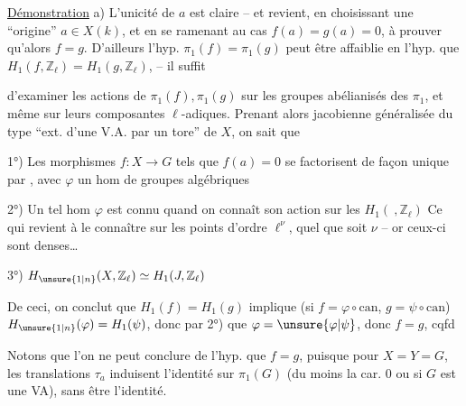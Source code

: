 
\uline{Démonstration} a) L'unicité de $a$ est claire -- et   revient,  en choisissant une ``origine'' $a\in X(k)$, et en se ramenant au cas $f(a)=g(a)=0$, à prouver qu'alors $f=g$. D'ailleurs l'hyp. $\pi_1(f)=\pi_1(g)$ peut être affaiblie en l'hyp. que  $H_1(f,\mathbb Z_\ell)=H_1(g,\mathbb Z_\ell)$,  --  il suffit

d'examiner les actions de $\pi_1(f),\pi_1(g)$ sur les groupes abélianisés des $\pi_1$, et même sur leurs composantes $\ell$-adiques. Prenant alors jacobienne généralisée du type ``ext. d'une V.A. par un tore'' de $X$, on sait que

1°) Les morphismes $f:X\longrightarrow G$ tels que $f(a)=0$ se factorisent de façon unique par
,
avec $\varphi$ un hom de groupes algébriques

2°)  Un tel hom $\varphi$ est connu quand on connaît son action sur les $H_1(\ ,\mathbb Z_\ell)$ Ce qui revient à le connaître sur les points d'ordre $\ell^\nu$, quel que soit $\nu$ -- or ceux-ci sont denses\ldots

3°) $H_{\unsure{1|n}}(X,\mathbb Z_\ell)\simeq H_1(J,\mathbb Z_\ell)$

De ceci,  on conclut  que $H_1(f)=H_1(g)$ implique (si $f=\varphi\circ\mathrm{can}$, $g=\psi\circ\mathrm{can}$) $H_{\unsure{1|n}}(\varphi)=H_1(\psi)$, donc par 2°) que $\varphi=\unsure{\varphi|\psi}$, donc $f=g$, cqfd

 Notons que l'on ne peut conclure de l'hyp.  que $f=g$, puisque pour $X=Y=G$, les translations $\tau_a$ induisent l'identité sur $\pi_1(G)$ (du moins  la car. $0$ ou si $G$ est une VA), sans être l'identité.

